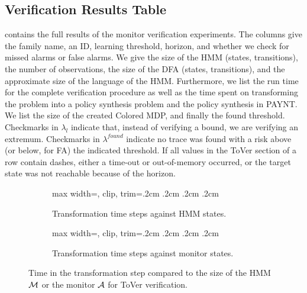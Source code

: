 \documentclass[runningheads]{llncs}
\newcommand{\alg}{ToVer\xspace}
\begin{document}
{\subsection{Verification Results Table}\label{app:verrestable}
 contains the full results of the monitor verification experiments. The columns give the family name, an ID, learning threshold, horizon, and whether we check for missed alarms or false alarms. We give the size of the HMM (states, transitions), the number of observations, the size of the DFA (states, transitions), and the approximate size of the language of the HMM. Furthermore, we list the run time for the complete verification procedure as well as the time spent on transforming the problem into a policy synthesis problem and the policy synthesis in PAYNT. We list the size of the created Colored MDP, and finally the found threshold. Checkmarks in $\lambda_l$ indicate that, instead of verifying a bound, we are verifying an extremum. Checkmarks in $\lambda^{found}$ indicate no trace was found with a risk above (or below, for FA) the indicated threshold. If all values in the \alg section of a row contain dashes, either a time-out or out-of-memory occurred, or the target state was not reachable because of the horizon.


\begin{figure}[t]
    \begin{subfigure}{0.48\linewidth}
        \begin{adjustbox}{max width=\linewidth, clip, trim=.2cm .2cm .2cm .2cm}
            
        \end{adjustbox}
        \caption{Transformation time steps against HMM states.}
    \end{subfigure}\hfill
    \begin{subfigure}{0.48\linewidth}
        \begin{adjustbox}{max width=\linewidth, clip, trim=.2cm .2cm .2cm .2cm}
            
        \end{adjustbox}
        \caption{Transformation time steps against monitor states.}
    \end{subfigure}
    \caption{Time in the transformation step compared to the size of the HMM $\mathcal{M}$ or the monitor $\mathcal{A}$ for \alg verification.}
    \label{fig:sizevsprod}
\end{figure}


\begin{scriptsize}
    \setlength\LTleft{-1.2cm}
    
\end{scriptsize}


}
\end{document}
